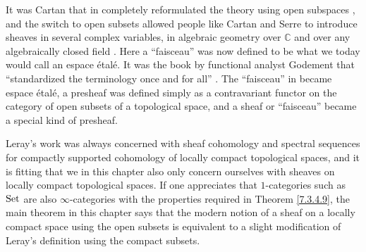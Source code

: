 \documentclass[../../thesis.tex]{subfiles}
\begin{document}
It was Cartan that in \cite{Cartan_50_4} completely reformulated the theory using open subspaces \cite{H.Miller}, and the switch to open subsets allowed people like Cartan and Serre to introduce sheaves in several complex variables, in algebraic geometry over $\mathbb{C}$ and over any algebraically closed field \cite{BorelAMS}.
Here a ``faisceau'' was now defined to be what we today would call an espace étalé.
It was the book \cite{Godement58} by functional analyst Godement that ``standardized the terminology once and for all'' \cite{Gray}.
The ``faisceau'' in \cite{Cartan_50_4} became espace étalé, a presheaf was defined simply as a contravariant functor on the category of open subsets of a topological space, and a sheaf or ``faisceau'' became a special kind of presheaf.


Leray's work was always concerned with sheaf cohomology and spectral sequences for compactly supported cohomology of locally compact topological spaces, and it is fitting that we in this chapter also only concern ourselves with sheaves on locally compact topological spaces.
If one appreciates that $1$-categories such as $\mathrm{Set}$ are also $\infty$-categories with the properties required in Theorem \ref{7.3.4.9}, the main theorem in this chapter says that the modern notion of a sheaf on a locally compact space using the open subsets is equivalent to a slight modification of Leray's definition using the compact subsets.
\end{document}
